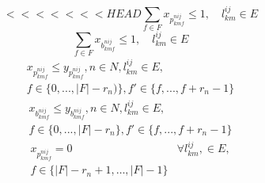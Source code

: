 \documentclass[a4j,twocolumn,fleqn]{jarticle}
\begin{document}
\begin{equation}%
<<<<<<< HEAD
\sum_{f \in F}x_{p^{nij}_{kmf}} \leq 1,\quad l^{ij}_{km} \in E
\end{equation}
\begin{equation}%
\sum_{f \in F}x_{b^{nij}_{kmf}} \leq 1,\quad l^{ij}_{km}\in E
\end{equation}
\begin{eqnarray}%
x_{p^{nij}_{kmf}} \leq y_{p^{nij}_{kmf}}, n \in N, l^{ij}_{km} \in E, \nonumber\\
f \in \{0, ... , |F|-r_n)\},f' \in \{f, ... ,f +r_n -1\}
\end{eqnarray}
\begin{eqnarray}%
x_{b^{nij}_{kmf}} \leq y_{b^{nij}_{kmf}}, n \in N, l^{ij}_{km} \in E, \nonumber \\
f \in \{0, ... , |F|-r_n\},f' \in \{f, ... ,f + r_n -1\}
\end{eqnarray}
\begin{eqnarray}%
x_{p^{nij}_{kmf}} = 0 & \forall l^{ij}_{km},\in E, \nonumber\\
f \in \{|F| - r_n+1, \dots ,|F|-1\}
\end{eqnarray}
\end{document}
